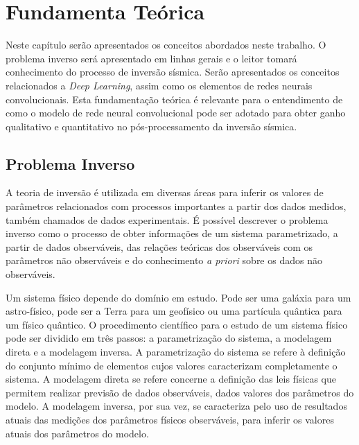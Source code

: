 \chapter{Fundamenta Teórica}
Neste capítulo serão apresentados os conceitos
abordados neste trabalho. O problema inverso será apresentado
em linhas gerais e o leitor tomará conhecimento do processo de inversão sísmica.
Serão apresentados os conceitos relacionados a \textit{Deep Learning}, assim como os
elementos de redes neurais convolucionais. Esta fundamentação
teórica é relevante para o entendimento de como o modelo de rede neural convolucional
pode ser adotado para obter ganho qualitativo e quantitativo no pós-processamento
da inversão sísmica.

\section{Problema Inverso}

A teoria de inversão é utilizada em diversas áreas para inferir os valores de
parâmetros relacionados com processos importantes a partir dos dados medidos,
também chamados de dados experimentais. É possível descrever o problema inverso
como o processo de obter informações de um sistema parametrizado, a partir de
dados observáveis, das relações teóricas dos observáveis com os parâmetros não
observáveis e do conhecimento \textit{a priori} sobre os dados não observáveis.

Um sistema físico depende do domínio em estudo. Pode ser uma galáxia para um
astro-físico, pode ser a Terra para um geofísico ou uma partícula quântica
para um físico quântico. O procedimento científico para o estudo de um sistema
físico pode ser dividido em três passos: a parametrização do sistema, a modelagem direta e a modelagem inversa.
A parametrização do sistema se refere à definição do conjunto mínimo de elementos cujos
valores caracterizam completamente o sistema. A modelagem direta se refere concerne a
definição das leis físicas que permitem realizar previsão de dados observáveis, dados
valores dos parâmetros do modelo. A modelagem inversa, por sua vez, se caracteriza pelo
uso de resultados atuais das medições dos parâmetros físicos observáveis, para inferir os valores atuais dos
parâmetros do modelo.

